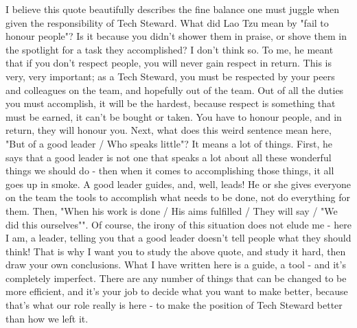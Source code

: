 \documentclass[11pt,a4paper]{book}
\begin{document}
I believe this quote beautifully describes the fine balance one must juggle when given the responsibility of Tech Steward. What did Lao Tzu mean by "fail to honour people"? Is it because you didn't shower them in praise, or shove them in the spotlight for a task they accomplished? I don't think so. To me, he meant that if you don't respect people, you will never gain respect in return. This is very, very important; as a Tech Steward, you must be respected by your peers and colleagues on the team, and hopefully out of the team. Out of all the duties you must accomplish, it will be the hardest, because respect is something that must be earned, it can't be bought or taken. You have to honour people, and in return, they will honour you. Next, what does this weird sentence mean here, "But of a good leader / Who speaks little"? It means a lot of things. First, he says that a good leader is not one that speaks a lot about all these wonderful things we should do - then when it comes to accomplishing those things, it all goes up in smoke. A good leader guides, and, well, leads! He or she gives everyone on the team the tools to accomplish what needs to be done, not do everything for them. Then, "When his work is done / His aims fulfilled / They will say / "We did this ourselves"". Of course, the irony of this situation does not elude me - here I am, a leader, telling you that a good leader doesn't tell people what they should think! That is why I want you to study the above quote, and study it hard, then draw your own conclusions. What I have written here is a guide, a tool - and it's completely imperfect. There are any number of things that can be changed to be more efficient, and it's your job to decide what you want to make better, because that's what our role really is here - to make the position of Tech Steward better than how we left it.
\end{document}
